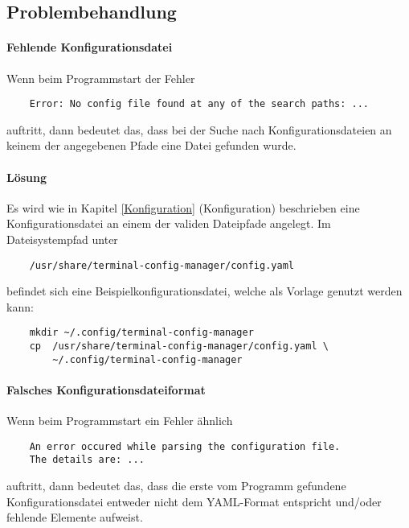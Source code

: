 \subsection{Problembehandlung} \label{Problembehandlung}
\paragraph{Fehlende Konfigurationsdatei} Wenn beim Programmstart der Fehler
\begin{verbatim}
    Error: No config file found at any of the search paths: ...
\end{verbatim}
auftritt, dann bedeutet das, dass bei der Suche nach Konfigurationsdateien an
keinem der angegebenen Pfade eine Datei gefunden wurde.
\paragraph{Lösung}
Es wird wie in Kapitel \ref{Konfiguration} (Konfiguration) beschrieben eine
Konfigurationsdatei an einem der validen Dateipfade angelegt. Im Dateisystempfad
unter

\begin{verbatim}
    /usr/share/terminal-config-manager/config.yaml
\end{verbatim}

befindet sich eine Beispielkonfigurationsdatei, welche als Vorlage genutzt
werden kann:

\begin{verbatim}
    mkdir ~/.config/terminal-config-manager
    cp  /usr/share/terminal-config-manager/config.yaml \
        ~/.config/terminal-config-manager
\end{verbatim}

\paragraph{Falsches Konfigurationsdateiformat} \label{missing-config} Wenn beim
Programmstart ein Fehler ähnlich

\begin{verbatim}
    An error occured while parsing the configuration file.
    The details are: ...
\end{verbatim}

auftritt, dann bedeutet das, dass die erste vom Programm gefundene Konfigurationsdatei
entweder nicht dem YAML-Format \cite{yaml} entspricht und/oder fehlende Elemente aufweist.

